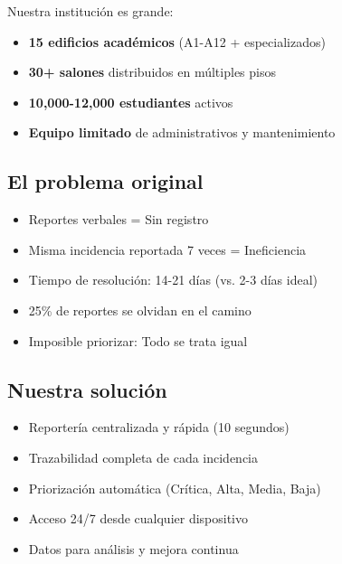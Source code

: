 \documentclass[12pt, a4paper, spanish]{article}
\begin{document}
Nuestra institución es grande:

\begin{itemize}
    \item \textbf{15 edificios académicos} (A1-A12 + especializados)
    \item \textbf{30+ salones} distribuidos en múltiples pisos
    \item \textbf{10,000-12,000 estudiantes} activos
    \item \textbf{Equipo limitado} de administrativos y mantenimiento
\end{itemize}

\subsection{El problema original}

\begin{tcolorbox}[colback=rojo!10, colframe=rojo!50, title=Problemas Identificados]
\begin{itemize}
    \item Reportes verbales = Sin registro
    \item Misma incidencia reportada 7 veces = Ineficiencia
    \item Tiempo de resolución: 14-21 días (vs. 2-3 días ideal)
    \item 25\% de reportes se olvidan en el camino
    \item Imposible priorizar: Todo se trata igual
\end{itemize}
\end{tcolorbox}

\subsection{Nuestra solución}

\begin{tcolorbox}[colback=verde!10, colframe=verde!50, title=Beneficios del Sistema]
\begin{itemize}
    \item[\checkmark] Reportería centralizada y rápida (10 segundos)
    \item[\checkmark] Trazabilidad completa de cada incidencia
    \item[\checkmark] Priorización automática (Crítica, Alta, Media, Baja)
    \item[\checkmark] Acceso 24/7 desde cualquier dispositivo
    \item[\checkmark] Datos para análisis y mejora continua
\end{itemize}
\end{tcolorbox}
\end{document}
